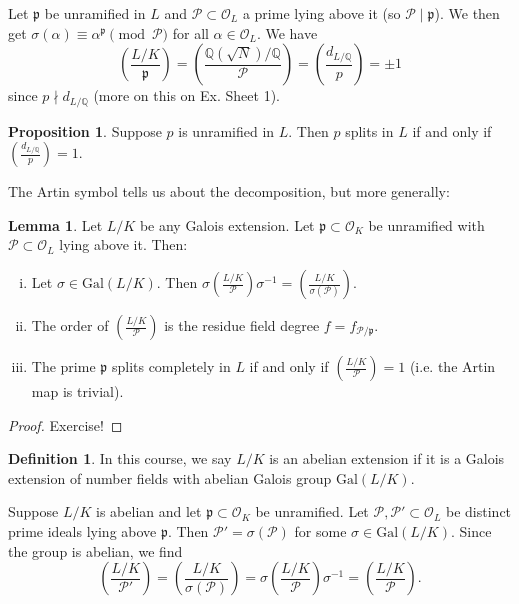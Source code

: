 \documentclass{article}
\theoremstyle{definition}
\newtheorem{lemma}[theorem]{Lemma}
\newtheorem{prop}[theorem]{Proposition}
\newtheorem{defn}[theorem]{Definition}
\begin{document}
Let $\mathfrak{p}$ be unramified in $L$ and $\mathcal{P} \subset \mathcal{O}_L$ a prime lying above it (so $\mathcal{P} \mid \mathfrak{p}$). We then get $\sigma(\alpha) \equiv \alpha^{\mathfrak{p}} \pmod{\mathcal{P}}$ for all $\alpha \in \mathcal{O}_L$. We have \[
\left(\frac{L/K}{\mathfrak{p}}\right) = \left(\frac{\mathbb{Q}(\sqrt{N})/\mathbb{Q}}{\mathcal{P}}\right) = \left(\frac{d_{L/\mathbb{Q}}}{p}\right) = \pm 1
\]
since $p \nmid d_{L/\mathbb{Q}}$ (more on this on Ex. Sheet 1).
\begin{prop}
    Suppose $p$ is unramified in $L$. Then $p$ splits in $L$ if and only if $\left(\frac{d_{L/\mathbb{Q}}}{p}\right) = 1$.
\end{prop}
The Artin symbol tells us about the decomposition, but more generally:
\begin{lemma}
    Let $L/K$ be any Galois extension. Let $\mathfrak{p} \subset \mathcal{O}_K$ be unramified with $\mathcal{P} \subset \mathcal{O}_L$ lying above it. Then:
    \begin{enumerate}[(i)]
        \item Let $\sigma \in \text{Gal}(L/K)$. Then $\sigma \left(\frac{L/K}{\mathcal{P}}\right)\sigma^{-1} = \left(\frac{L/K}{\sigma(\mathcal{P})}\right)$.
        \item The order of $\left(\frac{L/K}{\mathcal{P}}\right)$ is the residue field degree $f = f_{\mathcal{P}/\mathfrak{p}}$.
        \item The prime $\mathfrak{p}$ splits completely in $L$ if and only if $\left(\frac{L/K}{\mathcal{P}}\right) = 1$ (i.e. the Artin map is trivial).
    \end{enumerate}
\end{lemma}
\begin{proof}
    Exercise!
\end{proof}
\begin{defn}
    In this course, we say $L/K$ is an abelian extension if it is a Galois extension of number fields with abelian Galois group $\text{Gal}(L/K)$.
\end{defn}
Suppose $L/K$ is abelian and let $\mathfrak{p} \subset \mathcal{O}_K$ be unramified. Let $\mathcal{P}, \mathcal{P}' \subset \mathcal{O}_L$ be distinct prime ideals lying above $\mathfrak{p}$. Then $\mathcal{P}' = \sigma(\mathcal{P})$ for some $\sigma \in \text{Gal}(L/K)$. Since the group is abelian, we find
\[
\left(\frac{L/K}{\mathcal{P}'}\right) = \left(\frac{L/K}{\sigma(\mathcal{P})}\right) = \sigma\left(\frac{L/K}{\mathcal{P}}\right)\sigma^{-1} = \left(\frac{L/K}{\mathcal{P}}\right).
\]
\end{document}
